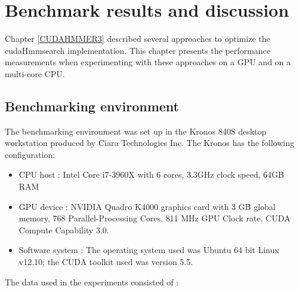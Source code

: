 
\chapter{Benchmark results and discussion} %
\label{Results} %


Chapter \ref{CUDAHMMER3} described several approaches to optimize the cudaHmmsearch implementation. This chapter presents the performance measurements when experimenting with these approaches on a GPU and on a multi-core CPU.

\section{Benchmarking environment}
\label{bench}
The benchmarking environment was set up in the Kronos 840S desktop workstation produced by Ciara Technologies Inc. \citep{Kronos} The Kronos has the following configuration:
 
\begin{itemize}
 \item CPU host : Intel Core i7-3960X with 6 cores, 3.3GHz clock speed, 64GB RAM
 \item GPU device : NVIDIA Quadro K4000 graphics card with 3 GB global memory, 768 Parallel-Processing Cores, 811 MHz GPU Clock rate, CUDA Compute Capability 3.0.
 \item Software system : The operating system used was Ubuntu 64 bit Linux v12.10; the CUDA toolkit used was version 5.5.
\end{itemize}

The data used in the experiments consisted of :

